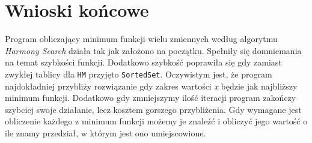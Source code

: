 \documentclass[10pt, a4paper]{article}
\begin{document}
\section{Wnioski końcowe}
\label{sec:wnioski}
Program obliczający minimum funkcji wielu zmiennych według algorytmu {\em Harmony Search} działa tak jak założono na początku. Spełniły się domniemania na temat szybkości funkcji. Dodatkowo szybkość poprawiła się gdy zamiast zwykłej tablicy dla {\tt HM} przyjęto {\tt SortedSet}. Oczywistym jest, że program najdokładniej przybliży rozwiązanie gdy zakres wartości {\em x} będzie jak najbliższy minimum funkcji. Dodatkowo gdy zmniejszymy ilość iteracji program zakończy szybciej swoje działanie, lecz kosztem gorszego przybliżenia. Gdy wymagane jest obliczenie każdego z minimum funkcji możemy je znaleźć i obliczyć jego wartość o ile znamy przedział, w którym jest ono umiejscowione. 

\newpage
{}


\end{document}
